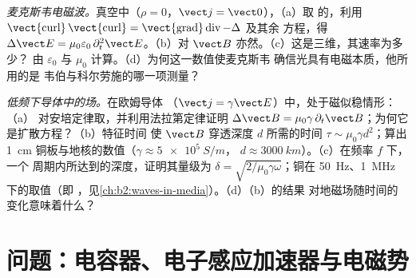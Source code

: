 \begin{exercise}[$\star\star\star$]\label{exo:b2:maxwell-equations:11}
\emph{麦克斯韦电磁波。}真空中（$\rho = 0$，$\vect j = \vect 0$），（a）取
的，利用 $\operatorname{\vect{curl}}
\operatorname{\vect{curl}} = \operatorname{\vect{grad}}\operatorname{div} - \Delta$ 及其余
方程，得 $\Delta\vect E = \mu_0\varepsilon_0\,\partial_t^2\vect E$。（b）对
$\vect B$ 亦然。（c）这是三维，其速率为多少？
由 $\varepsilon_0$ 与 $\mu_0$ 计算。（d）为何这一数值使麦克斯韦
确信光具有电磁本质，他所用的是
韦伯与科尔劳施的哪一项测量？
\end{exercise}

\begin{exercise}[$\star\star\star$]\label{exo:b2:maxwell-equations:12}
\emph{低频下导体中的场。}在欧姆导体
（$\vect j = \gamma\vect E$）中，处于磁似稳情形：（a）
对安培定律取，并利用法拉第定律证明 $\Delta\vect B = \mu_0\gamma\,
\partial_t\vect B$；为何它是扩散方程？（b）特征时间
使 $\vect B$ 穿透深度 $d$ 所需的时间 $\tau \sim \mu_0\gamma d^2$；算出
\qty{1}{cm} 铜板与地核的数值（$\gamma \approx \qty{5e5}{S/m}$，
$d \approx \qty{3000}{km}$）。（c）在频率 $f$ 下，一个
周期内所达到的深度，证明其量级为 $\delta = \sqrt{2/\mu_0\gamma\omega}$；铜在
\qty{50}{Hz}、\qty{1}{MHz} 下的取值（即
，见\cref{ch:b2:waves-in-media}）。（d）（b）的结果
对地磁场随时间的变化意味着什么？
\end{exercise}

\section{问题：电容器、电子感应加速器与电磁势}


